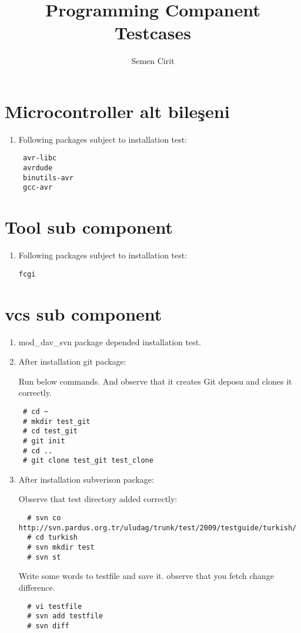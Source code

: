 \documentclass[a4paper,10pt]{article}
\title{Programming Companent Testcases}
\author{Semen Cirit}
\begin{document}
\maketitle
\section{Microcontroller alt bileşeni}
\begin{enumerate}
 \item Following packages subject to installation test:
\begin{verbatim}
 avr-libc
 avrdude
 binutils-avr
 gcc-avr
\end{verbatim}
\end{enumerate}
\section{Tool sub component}
 \begin{enumerate}
 \item Following packages subject to installation test:
\begin{verbatim}
fcgi 
\end{verbatim}
\end{enumerate}

\section{vcs sub component}
\begin{enumerate}
\item mod\_dav\_svn package depended installation test.
\item After installation git package:

Run below commands. And observe that it creates Git deposu and clones it correctly.
\begin{verbatim}
 # cd ~
 # mkdir test_git
 # cd test_git
 # git init
 # cd ..
 # git clone test_git test_clone
\end{verbatim}

\item After installation subverison package:

Observe that test directory added correctly:
\begin{verbatim}
  # svn co http://svn.pardus.org.tr/uludag/trunk/test/2009/testguide/turkish/
  # cd turkish
  # svn mkdir test
  # svn st
 \end{verbatim}
Write some words to testfile and save it. observe that you fetch change difference.
\begin{verbatim}
  # vi testfile
  # svn add testfile
  # svn diff
 \end{verbatim}
\end{enumerate}
\end{document}
